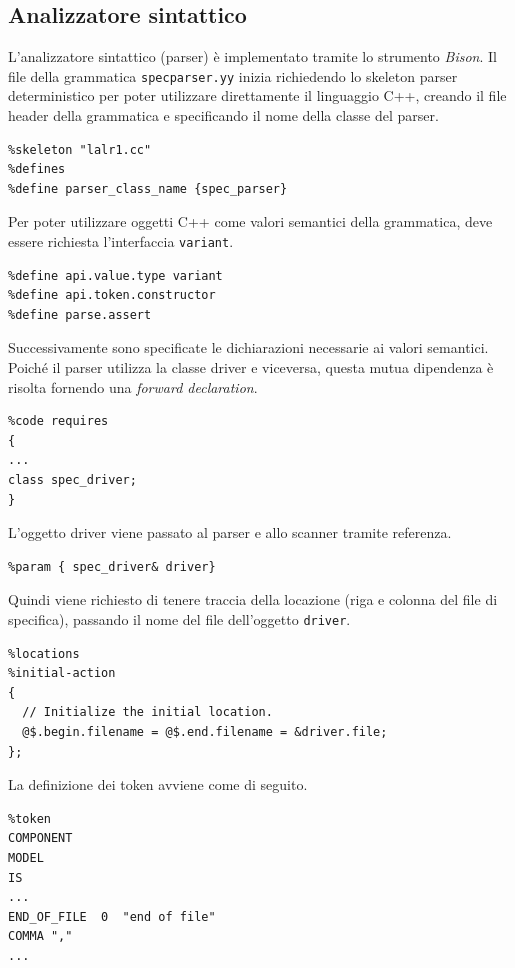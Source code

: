 \subsection{Analizzatore sintattico}
L'analizzatore sintattico (parser) è implementato tramite lo strumento \emph{Bison}.
Il file della grammatica \verb|specparser.yy| inizia richiedendo lo skeleton parser deterministico per poter utilizzare direttamente il linguaggio C++, creando il file header della grammatica e specificando il nome della classe del parser.

\begin{verbatim}
%skeleton "lalr1.cc"
%defines
%define parser_class_name {spec_parser}
\end{verbatim}

Per poter utilizzare oggetti C++ come valori semantici della grammatica, deve essere richiesta l'interfaccia \verb|variant|.

\begin{verbatim}
%define api.value.type variant
%define api.token.constructor
%define parse.assert
\end{verbatim}
 
Successivamente sono specificate le dichiarazioni necessarie ai valori semantici. Poiché il parser utilizza la classe driver e viceversa, questa mutua dipendenza è risolta fornendo una \emph{forward declaration}. 

\begin{verbatim}
%code requires
{
...
class spec_driver;
}
\end{verbatim}

L'oggetto driver viene passato al parser e allo scanner tramite referenza.

\begin{verbatim}
%param { spec_driver& driver}
\end{verbatim}

Quindi viene richiesto di tenere traccia della locazione (riga e colonna del file di specifica), passando il nome del file dell'oggetto \verb|driver|.

\begin{verbatim}
%locations
%initial-action
{
  // Initialize the initial location.
  @$.begin.filename = @$.end.filename = &driver.file;
};
\end{verbatim}

La definizione dei token avviene come di seguito.

\begin{verbatim}
%token
COMPONENT
MODEL
IS
...
END_OF_FILE  0  "end of file"
COMMA ","
...
\end{verbatim}

